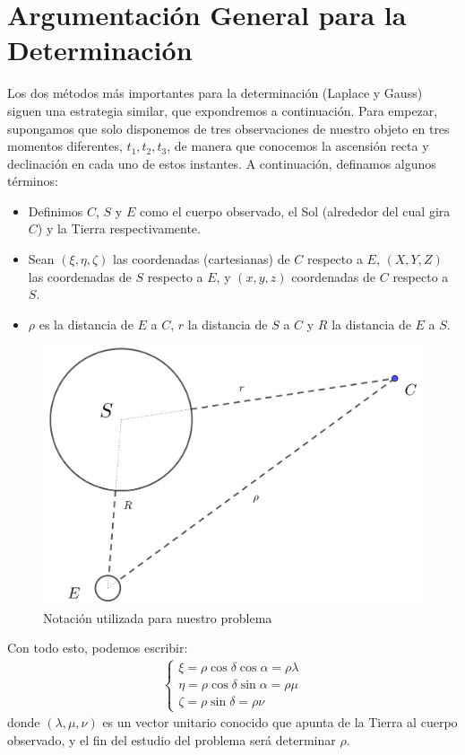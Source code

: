 \documentclass[11pt]{book}
\begin{document}
\section{Argumentación General para la Determinación}
Los dos métodos más importantes para la determinación (Laplace y Gauss) siguen una estrategia similar, que expondremos a continuación. Para empezar, supongamos que solo disponemos de tres observaciones de nuestro objeto en tres momentos diferentes, $t_1, t_2, t_3$, de manera que conocemos la ascensión recta y declinación en cada uno de estos instantes. A continuación, definamos algunos términos:
\begin{itemize}
\item Definimos $C$, $S$ y $E$ como el cuerpo observado, el Sol (alrededor del cual gira $C$) y la Tierra respectivamente.
\item Sean $(\xi,\eta,\zeta)$ las coordenadas (cartesianas) de $C$ respecto a $E$, $(X,Y,Z)$ las coordenadas de $S$ respecto a $E$, y $(x,y,z)$ coordenadas de $C$ respecto a $S$.
\item $\rho$ es la distancia de $E$ a $C$, $r$ la distancia de $S$ a $C$ y $R$ la distancia de $E$ a $S$.
\end{itemize}

\begin{figure}[H]
\centering
\includegraphics[scale=0.15]{images/notation.png}
\caption{Notación utilizada para nuestro problema}
\label{fig:notation}
\end{figure}

Con todo esto, podemos escribir:
\begin{align}
\left\{
\begin{array}{l}
\xi = \rho \cos{\delta}\cos{\alpha} = \rho\lambda\\
\eta = \rho \cos{\delta}\sin{\alpha} = \rho\mu\\
\zeta = \rho \sin{\delta} = \rho\nu
\end{array}
\right.
\label{eq:terminologia}
\end{align}
\noindent donde $(\lambda,\mu,\nu)$ es un vector unitario conocido que apunta de la Tierra al cuerpo observado, y el fin del estudio del problema será determinar $\rho$.\\
\end{document}
